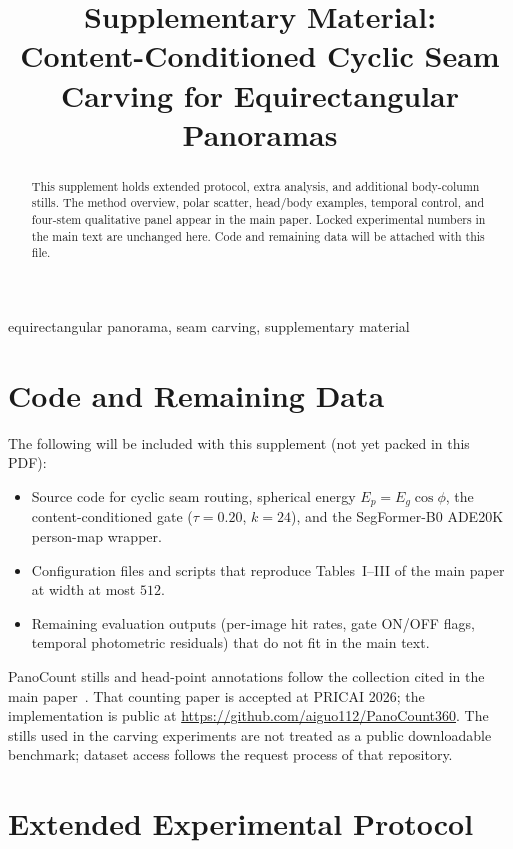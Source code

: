 \documentclass[conference,a4paper]{IEEEtran}
\title{Supplementary Material:\\
Content-Conditioned Cyclic Seam Carving for Equirectangular Panoramas}
\author{\IEEEauthorblockN{Anonymous Authors}
\IEEEauthorblockA{Affiliation withheld for double-blind review}}
\begin{document}
\maketitle

\begin{abstract}
This supplement holds extended protocol, extra analysis, and
additional body-column stills. The method overview, polar
scatter, head/body examples, temporal control, and four-stem
qualitative panel appear in the main paper. Locked experimental
numbers in the main text are unchanged here. Code and remaining
data will be attached with this file.
\end{abstract}

\begin{IEEEkeywords}
equirectangular panorama, seam carving, supplementary material
\end{IEEEkeywords}

\section{Code and Remaining Data}
\label{sec:supp-code}

The following will be included with this supplement (not yet
packed in this PDF):
\begin{itemize}
  \item Source code for cyclic seam routing, spherical energy
  $E_p=E_g\cos\phi$, the content-conditioned gate
  ($\tau=0.20$, $k=24$), and the SegFormer-B0 ADE20K person-map
  wrapper.
  \item Configuration files and scripts that reproduce Tables~I--III
  of the main paper at width at most $512$.
  \item Remaining evaluation outputs (per-image hit rates, gate
  ON/OFF flags, temporal photometric residuals) that do not fit
  in the main text.
\end{itemize}
PanoCount stills and head-point annotations follow
the collection cited in the main paper~\cite{arbi2025panocount}.
That counting paper is accepted at {PRICAI} 2026; the
implementation is public at
\url{https://github.com/aiguo112/PanoCount360}. The stills used
in the carving experiments are not treated as a public
downloadable benchmark; dataset access follows the request
process of that repository.

\section{Extended Experimental Protocol}
\label{sec:supp-protocol}
\end{document}
